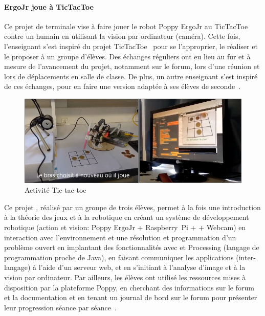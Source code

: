             \paragraph{ErgoJr joue à TicTacToe}
                Ce projet de terminale vise à faire jouer le robot Poppy ErgoJr au TicTacToe contre un humain en utilisant la vision par ordinateur (caméra).
                Cette fois, l'enseignant s'est inspiré du projet TicTacToe~ pour se l'approprier, le réaliser et le proposer à un groupe d'élèves. Des échanges réguliers ont eu lieu au fur et à mesure de l'avancement du projet, notamment sur le forum, lors d'une réunion et lors de déplacements en salle de classe. De plus, un autre enseignant s'est inspiré de ces échanges, pour en faire une version adaptée à ses élèves de seconde~.
                \begin{figure}[!h]
                    \centering
                    \includegraphics[width=\linewidth]{Figures/Noirpoudre-tic-tac-toe.png}
                    \caption{Activité Tic-tac-toe}\label{fig:tic-tac-toe}
                \end{figure}\par%
                Ce projet , réalisé par un groupe de trois élèves, permet à la fois une introduction à la théorie des jeux et à la robotique en créant un système de développement robotique (action et vision: Poppy ErgoJr + Raspberry~Pi +  + Webcam) en interaction avec l'environnement et une résolution et programmation d'un problème ouvert en implantant des fonctionnalités avec  et Processing (langage de programmation proche de Java), en faisant communiquer les applications (inter-langage) à l'aide d'un serveur web, et en s'initiant à l'analyse d'image et à la vision par ordinateur. 
                Par ailleurs, les élèves ont utilisé les ressources mises à disposition par la plateforme Poppy, en cherchant des informations sur le forum et la documentation et en tenant
                un journal de bord sur le forum pour présenter leur progression séance par séance~.

